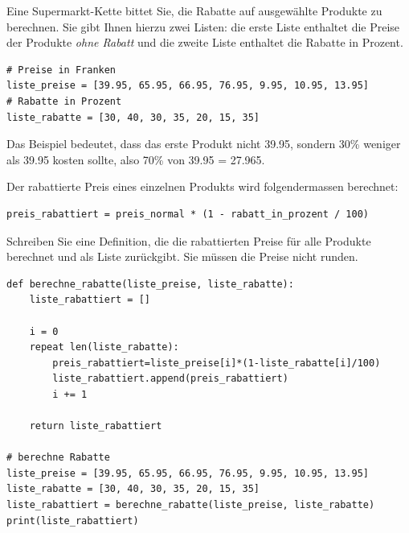 \begin{myexercise}
    Eine Supermarkt-Kette bittet Sie, die Rabatte auf ausgewählte Produkte zu berechnen. Sie gibt Ihnen hierzu zwei Listen: die erste Liste enthaltet die Preise der Produkte \textit{ohne Rabatt} und die zweite Liste enthaltet die Rabatte in Prozent.

    \begin{lstlisting}
# Preise in Franken
liste_preise = [39.95, 65.95, 66.95, 76.95, 9.95, 10.95, 13.95] 
# Rabatte in Prozent
liste_rabatte = [30, 40, 30, 35, 20, 15, 35] 
\end{lstlisting}

    Das Beispiel bedeutet, dass das erste Produkt nicht 39.95, sondern 30\% weniger als 39.95 kosten sollte, also 70\% von 39.95 = 27.965.

    Der rabattierte Preis eines einzelnen Produkts wird folgendermassen berechnet:
    \begin{lstlisting}
preis_rabattiert = preis_normal * (1 - rabatt_in_prozent / 100)
\end{lstlisting}
    Schreiben Sie eine Definition, die die rabattierten Preise für alle Produkte berechnet und als Liste zurückgibt. Sie müssen die Preise nicht runden.

    \begin{myanswer}
        \begin{lstlisting}
def berechne_rabatte(liste_preise, liste_rabatte):
    liste_rabattiert = []
    
    i = 0
    repeat len(liste_rabatte):
        preis_rabattiert=liste_preise[i]*(1-liste_rabatte[i]/100)
        liste_rabattiert.append(preis_rabattiert)
        i += 1
        
    return liste_rabattiert

# berechne Rabatte
liste_preise = [39.95, 65.95, 66.95, 76.95, 9.95, 10.95, 13.95]
liste_rabatte = [30, 40, 30, 35, 20, 15, 35]
liste_rabattiert = berechne_rabatte(liste_preise, liste_rabatte)
print(liste_rabattiert)
\end{lstlisting}
    \end{myanswer}
\end{myexercise}

